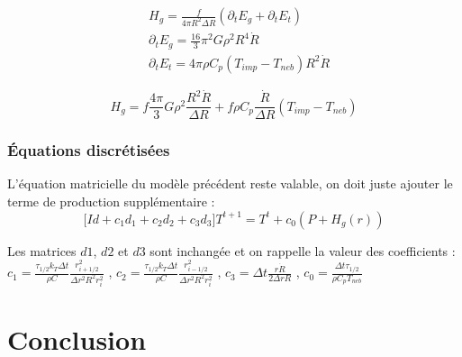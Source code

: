 \documentclass[10pt,a4paper]{article}
\numberwithin{equation}{section}
\begin{document}
\begin{align}
 &H_g = \frac{f}{4 \pi R^2 \Delta R}(\partial_{t} E_g + \partial_{t} E_t) \\
 &\partial_{t} E_g =\frac{16}{3} \pi^2 G \rho^2 R^4 \dot R \\
 &\partial_{t} E_t = 4 \pi \rho C_p ( T_{imp} - T_{neb} ) R^2 \dot R
\end{align}


\begin{equation}
H_g = f \frac{4 \pi}{3} G \rho^2 \frac{R^2\dot R}{\Delta R} + f \rho C_p \frac{\dot R}{\Delta R} ( T_{imp} - T_{neb} )
\end{equation}


\subsubsection{Équations discrétisées}

L'équation matricielle du modèle précédent reste valable, on doit juste ajouter le terme de production supplémentaire :
\begin{equation}
\Big [ Id + 
c_1  d_1 +  
c_2  d_2 +
c_3  d_3
 \Big] T^{t+1} = T^t + c_0 (P + H_g(r))
\end{equation}

Les matrices $d1$, $d2$ et $d3$ sont inchangée et on rappelle la valeur des coefficients : \\
$c_1 = \frac{\tau_{1/2} k_T \Delta t }{\rho C  }
\frac{r^2_{i+1/2}}{\Delta r^2 R^2 r^2_i}$
, $c_2 = \frac{\tau_{1/2} k_T \Delta t }{\rho C  }
\frac{r^2_{i-1/2}}{\Delta r^2 R^2 r^2_i}$
, $c_3 = \Delta t \frac{ r \dot{R}}{2\Delta r R}$
, $c_0 = \frac{\Delta t \tau_{1/2} }{\rho C_p T_{neb}}$ 



\section*{Conclusion}






\newpage
\appendix
\end{document}
